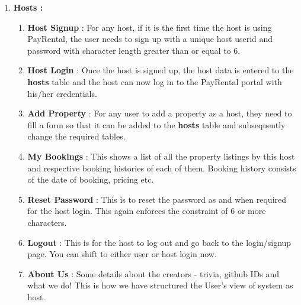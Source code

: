 \documentclass[10pt]{article}
\begin{document}
\begin{enumerate}
\begin{enumerate}
	\end{enumerate}
	\item \textbf{Hosts :}
	\begin{enumerate}
	    \item \textbf{Host Signup} :  For any host, if it is the first time the host is using PayRental, the user needs to sign up with a unique host userid and password with character length greater than or equal to 6. 
	    \item \textbf{Host Login} : Once the host is signed up, the host data is entered to the \textbf{hosts} table and the host can now log in to the PayRental portal with his/her credentials.
	    \item \textbf{Add Property} : For any user to add a property as a host, they need to fill a form so that it can be added to the \textbf{hosts} table and subsequently change the required tables. 
	    \item \textbf{My Bookings} :  This shows a list of all the property listings by this host and respective booking histories of each of them. Booking history consists of the date of booking, pricing etc. 
	    \item \textbf{Reset Password} : This is to reset the password as and when required for the host login. This again enforces the constraint of 6 or more characters.  
	    \item \textbf{Logout} : This is for the host to log out and go back to the login/signup page. You can shift to either user or host login now.
	    \item \textbf{About Us} : Some details about the creators - trivia, github IDs and what we do! This is how we have structured the User's view of system as host. 
	\end{enumerate}
\end{enumerate}
\end{document}
